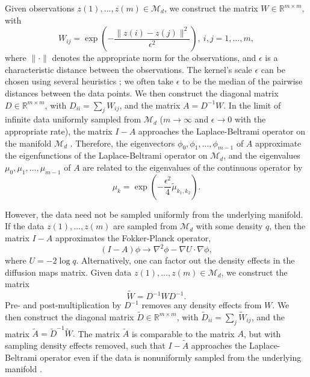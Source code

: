 \documentclass[preprint]{elsarticle}
\begin{document}
Given observations $z(1), \dots, z(m) \in \mathcal{M}_d$, we construct the matrix $W \in \mathbb{R}^{m \times m}$, with
\begin{equation} \label{eq:W}
W_{ij} = \exp \left( -\frac{\|z(i) - z(j) \|^2}{\epsilon^2} \right), \ i,j=1,\ldots,m,
\end{equation}
where $\| \cdot \|$ denotes the appropriate norm for the observations, and $\epsilon$ is a characteristic distance between the observations. 
%
The kernel's scale $\epsilon$ can be chosen using several heuristics \cite{coifman2008graph, rohrdanz2011determination}; we often take $\epsilon$ to be the median of the pairwise distances between the data points.
%
We then construct the diagonal matrix $D \in \mathbb{R}^{m \times m}$, with $D_{ii} = \sum_j W_{ij}$, and the matrix $A  = D^{-1} W.$
%
In the limit of infinite data uniformly sampled from $\mathcal{M}_d$ ($m \rightarrow \infty$ and $\epsilon \rightarrow 0$ with the appropriate rate), the matrix $I-A$ approaches the Laplace-Beltrami operator on the manifold $\mathcal{M}_d$ \cite{coifman2006geometric}. 
%
Therefore, the eigenvectors $\phi_0, \phi_1, \dots, \phi_{m-1}$ of $A$ approximate the eigenfunctions of the Laplace-Beltrami operator on $\mathcal{M}_d$,
and the eigenvalues $\mu_0, \mu_1, \dots, \mu_{m-1}$ of $A$ are related to the eigenvalues of the continuous operator by 
\begin{equation} \label{eq:evals_relationship}
\mu_k = \exp \left( -\frac{\epsilon^2}{4} \tilde{\mu}_{k_1, k_2}  \right).
\end{equation}
%

However, the data need not be sampled uniformly from the underlying manifold.
%
If the data $z(1), \dots, z(m)$ are sampled from $\mathcal{M}_d$ with some density $q$, then the matrix $I-A$ approximates the Fokker-Planck operator, 
\begin{equation}
(I-A) \phi \rightarrow \nabla^2 \phi - \nabla U \cdot \nabla \phi, 
\end{equation}
where $U = -2 \log q$. 
%
Alternatively, one can factor out the density effects in the diffusion maps matrix.
%
Given data $z(1), \dots, z(m) \in \mathcal{M}_d$, we construct the matrix
%
\begin{equation}
\tilde{W} = D^{-1} W D^{-1}.
\end{equation}
%
Pre- and post-multiplication by $D^{-1}$ removes any density effects from $W$. 
%
We then construct the diagonal matrix $\tilde{D} \in \mathbb{R}^{m \times m}$, with $\tilde{D}_{ii} = \sum_j \tilde{W}_{ij}$, and the matrix $\tilde{A}  = \tilde{D}^{-1} \tilde{W}.$
%
The matrix $\tilde{A}$ is comparable to the matrix $A$, but with sampling density effects removed, such that $I-\tilde{A}$ approaches the Laplace-Beltrami operator even if the data is nonuniformly sampled from the underlying manifold \cite{coifman2005geometric}. 
\end{document}
